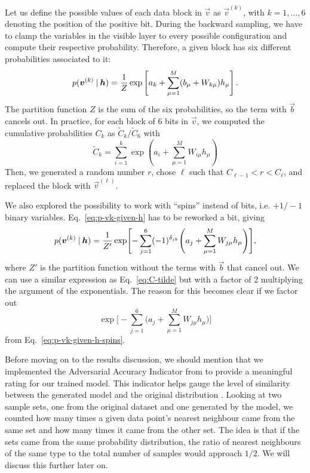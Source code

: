 \documentclass[prl, twocolumn]{revtex4-2}
\begin{document}
Let us define the possible values of each data block in $\vec{v}$ as
$\vec{v}^{(k)}$, with $k = 1, \dots, 6$ denoting the position of the
positive bit. During the backward sampling, we have to clamp the variables
in the visible layer to every possible configuration and compute their
respective probability. Therefore, a given block has six different
probabilities associated to it:
\begin{equation}
    p(\bm{v}^{(k)} \:\vert\: \bm{h}) = \frac{1}{Z} \exp\left[a_k + \sum_{\mu
    = 1}^{M} (b_\mu + W_{k\mu}) h_\mu \right].
    \label{eq:p-vk-given-h}
\end{equation}
The partition function $Z$ is the sum of the six probabilities, so the term
with $\vec{b}$ cancels out. In practice, for each block of 6 bits in
$\vec{v}$, we computed the cumulative probabilities $C_k$ as $\tilde{C}_k /
\tilde{C}_6$ with
\begin{equation}
    \tilde{C}_k = \sum_{i = 1}^{k} \exp\left(a_i + \sum_{\mu = 1}^{M}
    W_{i\mu} h_\mu\right)
    \label{eq:C-tilde}
\end{equation}
Then, we generated a random number $r$, chose $\ell$ such that
$C_{\ell-1}<r<C_\ell$, and replaced the block with $\vec{v}^{(\ell)}$. 

We also explored the possibility to work with “spins” instead of bits, i.e.
$+1/-1$ binary variables. Eq.~\eqref{eq:p-vk-given-h} has to be reworked a
bit, giving
\begin{equation}
    p(\bm{v}^{(k)} \:\vert\: \bm{h}) = \frac{1}{Z'}
    \exp\Biggl[
        - \sum_{j = 1}^{6} (-1)^{\delta_{jk}} \Biggl(a_j + \sum_{\mu =
        1}^{M} W_{j\mu} h_\mu\Biggr)
    \Biggr],
    \label{eq:p-vk-given-h-spins}
\end{equation}
where $Z'$ is the partition function without the terms with $\vec{b}$ that
cancel out. We can use a similar expression as Eq.~\eqref{eq:C-tilde} but
with a factor of 2 multiplying the argument of the exponentials. The reason
for this becomes clear if we factor out
\begin{equation}
    \exp\Biggl[-\sum_{j = 1}^{6} \Biggl(a_j + \sum_{\mu = 1}^{M} W_{j\mu}
    h_\mu\Biggr)\Biggr]
\end{equation}
from Eq.~\eqref{eq:p-vk-given-h-spins}.

Before moving on to the results discussion, we should mention that we
implemented the Adversarial Accuracy Indicator from \cite{Yale2020} to
provide a meaningful rating for our trained model. This indicator helps
gauge the level of similarity between the generated model and the original
distribution \cite{Decelle2022}. Looking at two sample sets, one from the
original dataset and one generated by the model, we counted how many times
a given data point’s nearest neighbour came from the same set and how many
times it came from the other set. The idea is that if the sets came from
the same probability distribution, the ratio of nearest neighbours of the
same type to the total number of samples would approach $1 / 2$. We will
discuss this further later on.
\end{document}
